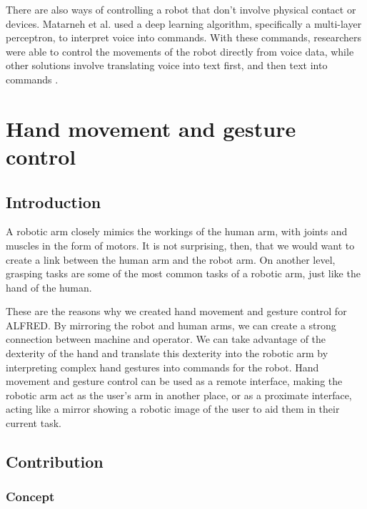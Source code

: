 There are also ways of controlling a robot that don't involve physical contact or devices. Matarneh et al. \cite{matarneh_maksymova_deineko_lyashenko_1970} used a deep learning algorithm, specifically a multi-layer perceptron, to interpret voice into commands. With these commands, researchers were able to control the movements of the robot directly from voice data, while other solutions involve translating voice into text first, and then text into commands \cite{Janicek_2021}.



\section{Hand movement and gesture control}


\subsection{Introduction}

A robotic arm closely mimics the workings of the human arm, with joints and muscles in the form of motors. It is not surprising, then, that we would want to create a link between the human arm and the robot arm. On another level, grasping tasks are some of the most common tasks of a robotic arm, just like the hand of the human.

These are the reasons why we created hand movement and gesture control for ALFRED. By mirroring the robot and human arms, we can create a strong connection between machine and operator. We can take advantage of the dexterity of the hand and translate this dexterity into the robotic arm by interpreting complex hand gestures into commands for the robot. Hand movement and gesture control can be used as a remote interface, making the robotic arm act as the user's arm in another place, or as a proximate interface, acting like a mirror showing a robotic image of the user to aid them in their current task.





\subsection{Contribution}

\subsubsection{Concept}

